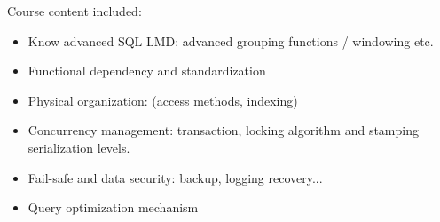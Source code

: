 Course content included:
\begin{itemize}
    \item Know advanced SQL LMD: advanced grouping functions / windowing etc.
    \item Functional dependency and standardization
    \item Physical organization: (access methods, indexing)
    \item Concurrency management: transaction, locking algorithm and stamping serialization levels.
    \item Fail-safe and data security: backup, logging recovery...
    \item Query optimization mechanism
\end{itemize}